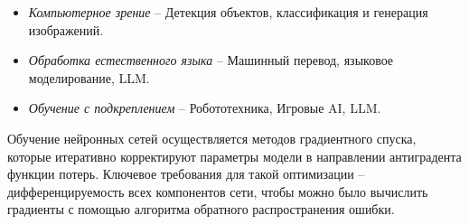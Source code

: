 \documentclass[../part_1.tex]{subfiles}
\begin{document}
\begin{itemize}
    \item \textit{Компьютерное зрение} -- Детекция объектов, классификация и генерация изображений.
    \item \textit{Обработка естественного языка} -- Машинный перевод, языковое моделирование, LLM.
    \item \textit{Обучение с подкреплением} -- Робототехника, Игровые AI, LLM.
\end{itemize}
\par Обучение нейронных сетей осуществляется методов градиентного спуска, которые итеративно корректируют параметры модели в направлении антиградента функции потерь. Ключевое требования для такой оптимизации -- дифференцируемость всех компонентов сети, чтобы можно было вычислить градиенты с помощью алгоритма обратного распространения ошибки. 
\end{document}
